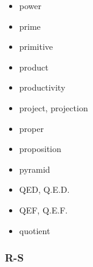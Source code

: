 \documentclass[12pt]{article}
\begin{document}
\begin{multicols}{3}
{\begin{itemize}
\item power
\item prime
\item primitive
\item product
\item productivity
\item project, projection
\item proper
\item proposition
\item pyramid
\item QED, Q.E.D.
\item QEF, Q.E.F.
\item quotient
\end{itemize}
}
\end{multicols}

\subsubsection*{R-S}
\end{document}
